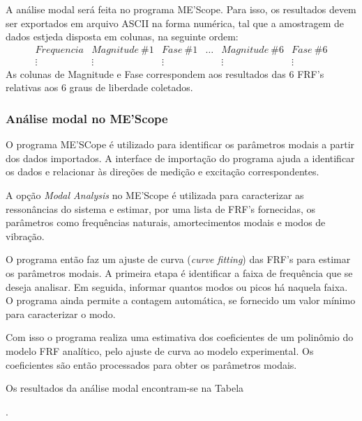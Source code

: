 
A análise modal será feita no programa ME'Scope. Para isso, os resultados devem
ser exportados em arquivo ASCII na forma numérica, tal que a amostragem de dados
estjeda disposta em colunas, na seguinte ordem:
%
\begin{equation*}
\begin{matrix}
Frequencia & Magnitude~\#1  & Fase~\#1  & \ldots & Magnitude~\#6 & Fase~\#6 \\ 
 \vdots & \vdots & \vdots &  & \vdots & \vdots
\end{matrix}
\end{equation*}
%
As colunas de Magnitude e Fase correspondem aos
resultados das 6 FRF's relativas aos 6 graus de liberdade coletados.

\subsubsection{Análise modal no ME'Scope}

O programa ME'SCope é utilizado para identificar os parâmetros modais a partir
dos dados importados. A interface de importação do programa ajuda a identificar
os dados e relacionar às direções de medição e excitação correspondentes. 

A opção \textit{Modal Analysis} no ME'Scope é utilizada para caracterizar as
ressonâncias do sistema e estimar, por uma lista de FRF's fornecidas, os
parâmetros como frequências naturais, amortecimentos modais e modos de vibração.

O programa então faz um ajuste de curva (\textit{curve fitting}) das FRF's para
estimar os parâmetros modais. A primeira etapa é identificar a faixa de
frequência que se deseja analisar. Em seguida, informar quantos modos ou picos
há naquela faixa. O programa ainda permite a contagem automática, se fornecido um
valor mínimo para caracterizar o modo.


Com isso o programa realiza uma estimativa dos coeficientes de um polinômio
do modelo FRF analítico, pelo ajuste de curva ao modelo experimental. Os
coeficientes são então processados para obter os parâmetros modais.


Os resultados da análise modal encontram-se na Tabela

.



